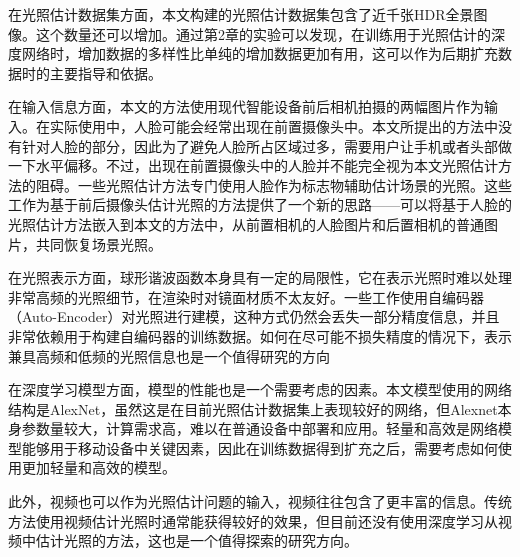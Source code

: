 在光照估计数据集方面，本文构建的光照估计数据集包含了近千张HDR全景图像。这个数量还可以增加。通过第2章的实验可以发现，在训练用于光照估计的深度网络时，增加数据的多样性比单纯的增加数据更加有用，这可以作为后期扩充数据时的主要指导和依据。

在输入信息方面，本文的方法使用现代智能设备前后相机拍摄的两幅图片作为输入。在实际使用中，人脸可能会经常出现在前置摄像头中。本文所提出的方法中没有针对人脸的部分，因此为了避免人脸所占区域过多，需要用户让手机或者头部做一下水平偏移。不过，出现在前置摄像头中的人脸并不能完全视为本文光照估计方法的阻碍。一些光照估计方法专门使用人脸作为标志物辅助估计场景的光照。这些工作为基于前后摄像头估计光照的方法提供了一个新的思路——可以将基于人脸的光照估计方法嵌入到本文的方法中，从前置相机的人脸图片和后置相机的普通图片，共同恢复场景光照。

在光照表示方面，球形谐波函数本身具有一定的局限性，它在表示光照时难以处理非常高频的光照细节，在渲染时对镜面材质不太友好。一些工作使用自编码器（Auto-Encoder）对光照进行建模，这种方式仍然会丢失一部分精度信息，并且非常依赖用于构建自编码器的训练数据。如何在尽可能不损失精度的情况下，表示兼具高频和低频的光照信息也是一个值得研究的方向

在深度学习模型方面，模型的性能也是一个需要考虑的因素。本文模型使用的网络结构是AlexNet，虽然这是在目前光照估计数据集上表现较好的网络，但Alexnet本身参数量较大，计算需求高，难以在普通设备中部署和应用。轻量和高效是网络模型能够用于移动设备中关键因素，因此在训练数据得到扩充之后，需要考虑如何使用更加轻量和高效的模型。

此外，视频也可以作为光照估计问题的输入，视频往往包含了更丰富的信息。传统方法使用视频估计光照时通常能获得较好的效果，但目前还没有使用深度学习从视频中估计光照的方法，这也是一个值得探索的研究方向。
